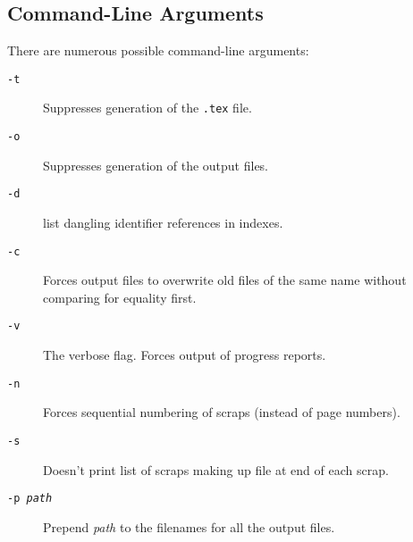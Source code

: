 \documentclass{report}
\begin{document}
\subsection{Command-Line Arguments}

There are numerous possible command-line arguments:
\begin{description}
\item[\tt -t] Suppresses generation of the {\tt .tex} file.
\item[\tt -o] Suppresses generation of the output files.
\item[\tt -d] list dangling identifier references in indexes.
\item[\tt -c] Forces output files to overwrite old files of the same
  name without comparing for equality first.
\item[\tt -v] The verbose flag. Forces output of progress reports.
\item[\tt -n] Forces sequential numbering of scraps (instead of page
  numbers).
\item[\tt -s] Doesn't print list of scraps making up file at end of
  each scrap.
\item[\tt -p \it path] Prepend \textit{path} to the filenames for
all the output files.
\end{description}
\end{document}
